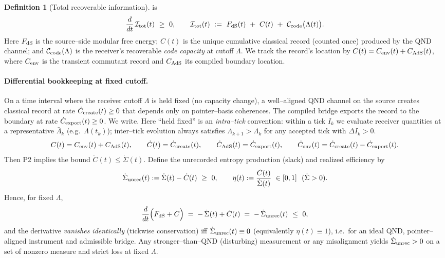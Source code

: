 \documentclass[10pt]{article}
\theoremstyle{definition}
\newtheorem{definition}{Definition}[section]
\theoremstyle{plain}
\begin{document}
\begin{definition}[Total recoverable information] is
\label{def:uom-main-001}
\[
\frac{d}{dt}\,\mathcal I_{\rm tot}(t)\ \ge\ 0,
\qquad
\mathcal I_{\rm tot}(t)\ :=\ F_{\rm dS}(t)\ +\ C(t)\ +\ \mathcal C_{\rm code}\big(\Lambda(t)\big).
\]
Here $F_{\rm dS}$ is the source–side modular free energy; $C(t)$ is the unique cumulative
classical record (counted once) produced by the QND channel; and $\mathcal C_{\rm code}(\Lambda)$ is the
receiver’s recoverable \emph{code capacity} at cutoff $\Lambda$. We track the record’s
location by $C(t)=C_{\rm env}(t)+C_{\rm AdS}(t)$, where $C_{\rm env}$ is the transient
commutant record and $C_{\rm AdS}$ its compiled boundary location.
\end{definition}

\paragraph{Differential bookkeeping at fixed cutoff.}\label{par:uom-main-017}
On a time interval where the receiver cutoff $\Lambda$ is held fixed (no capacity
change), a well–aligned QND channel on the source creates classical record at rate
$\dot C_{\rm create}(t)\ge0$ that depends only on pointer–basis coherences. The compiled
bridge exports the record to the boundary at rate $\dot C_{\rm export}(t)\ge0$. We write.
Here ``held fixed'' is an \emph{intra--tick} convention: within a tick $I_k$ we evaluate
receiver quantities at a representative $\bar\Lambda_k$ (e.g.\ $\Lambda(t_k)$);
inter--tick evolution always satisfies $\Lambda_{k+1}>\Lambda_k$ for any accepted tick
with $\Delta I_k>0$.
\[
C(t)=C_{\rm env}(t)+C_{\rm AdS}(t),\qquad
\dot C(t)=\dot C_{\rm create}(t),\qquad
\dot C_{\rm AdS}(t)=\dot C_{\rm export}(t),\qquad
\dot C_{\rm env}(t)=\dot C_{\rm create}(t)-\dot C_{\rm export}(t).
\]
Then P2 implies the bound $\dot C(t)\le \dot{\Sigma}(t)$.
Define the unrecorded entropy production (slack) and realized efficiency by
\[
\dot{\Sigma}_{\rm unrec}(t):=\dot{\Sigma}(t)-\dot C(t)\ \ge\ 0,\qquad
\eta(t):=\frac{\dot C(t)}{\dot{\Sigma}(t)}\ \in[0,1]\ \ (\dot{\Sigma}>0).
\]
Hence, for fixed $\Lambda$,
\[
\frac{d}{dt}\Big(F_{\rm dS}+C\Big)
\;=\; -\,\dot{\Sigma}(t)+\dot C(t)
\;=\; -\,\dot{\Sigma}_{\rm unrec}(t)\ \le\ 0,
\]
and the derivative \emph{vanishes identically} (tickwise conservation) iff
$\dot{\Sigma}_{\rm unrec}(t)\equiv0$ (equivalently $\eta(t)\equiv1$), i.e.\ for an
ideal QND, pointer–aligned instrument and admissible bridge. Any stronger–than–QND
(disturbing) measurement or any misalignment yields $\dot{\Sigma}_{\rm unrec}>0$ on a
set of nonzero measure and strict loss at fixed $\Lambda$.
\end{document}
